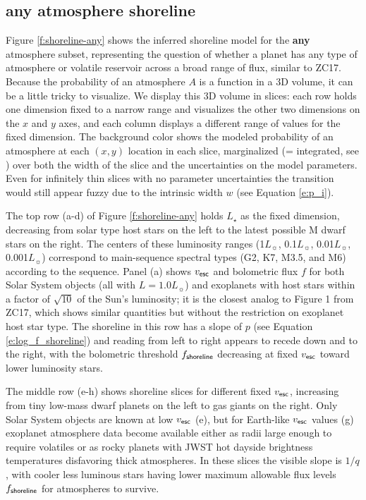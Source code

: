\documentclass[modern,linenumbers,trackchanges]{aastex7}
\begin{document}
\subsection{{\bf any} atmosphere shoreline}
Figure \ref{f:shoreline-any} shows the inferred shoreline model for the {\bf any} atmosphere subset, representing the question of whether a planet has any type of atmosphere or volatile reservoir across a broad range of flux, similar to ZC17. Because the probability of an atmosphere $A$ is a function in a 3D volume, it can be a little tricky to visualize. We display this 3D volume in slices: each row holds one dimension fixed to a narrow range and visualizes the other two dimensions on the $x$ and $y$ axes, and each column displays a different range of values for the fixed dimension. The background color shows the modeled probability of an atmosphere at each $(x, y)$ location in each slice, marginalized (= integrated, see \citealt{hoggDataAnalysisRecipes2010a, siviaDataAnalysisBayesian2011, vanderplasFrequentismBayesianismPythondriven2014a, ivezicStatisticsDataMining2020}) over both the width of the slice and the uncertainties on the model parameters. Even for infinitely thin slices with no parameter uncertainties the transition would still appear fuzzy due to the intrinsic width $w$ (see Equation \ref{e:p_i}). 



The top row (a-d) of Figure \ref{f:shoreline-any} holds $L_\star$ as the fixed dimension, decreasing from solar type host stars on the left to the latest possible M dwarf stars on the right. The centers of these luminosity ranges (1$L_\sun$, 0.1$L_\sun$, 0.01$L_\sun$, 0.001$L_\sun$) correspond to main-sequence spectral types (G2, K7, M3.5, and M6) according to the \citet{pecautINTRINSICCOLORSTEMPERATURES2013} sequence. Panel (a) shows $v_{\sf esc}$ and bolometric flux $f$ for both Solar System objects (all with $L = 1.0L_\sun$) and exoplanets with host stars within a factor of $\sqrt{10}$ of the Sun's luminosity; it is the closest analog to Figure 1 from ZC17, which shows similar quantities but without the restriction on exoplanet host star type. The shoreline in this row has a slope of $p$ (see Equation \ref{e:log_f_shoreline}) and reading from left to right appears to recede \citep[to borrow a visual metaphor from][]{passRecedingCosmicShoreline2025} down and to the right, with the bolometric threshold $f_{\sf shoreline}$ decreasing at fixed $v_{\sf esc}$ toward lower luminosity stars. 

The middle row (e-h) shows shoreline slices for different fixed $v_{\sf esc}$, increasing from tiny low-mass dwarf planets on the left to gas giants on the right. Only Solar System objects are known at low $v_{\sf esc}$ (e), but for Earth-like $v_{\sf esc}$ values (g) exoplanet atmosphere data become available either as radii large enough to require volatiles or as rocky planets with JWST hot dayside brightness temperatures disfavoring thick atmospheres. In these slices the visible slope is $1/q$, with cooler less luminous stars having lower maximum allowable flux levels $f_{\sf shoreline}$ for atmospheres to survive. 
\end{document}
